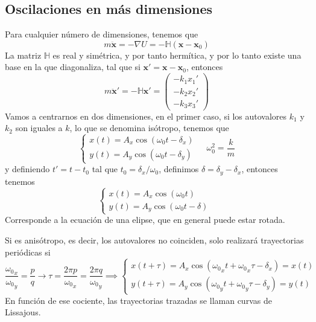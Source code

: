 \subsection{Oscilaciones en más dimensiones}
Para cualquier número de dimensiones, tenemos que
\begin{equation} \label{6.1.1}
    m\ddot{\mathbf{x}} = -\nabla U = -\mathbb{H} (\mathbf{x}-\mathbf{x}_0) 
\end{equation}
La matriz $\mathbb{H}$ es real y simétrica, y por tanto hermítica, y por lo tanto existe una base en la que diagonaliza, tal que si $\mathbf{x}' = \mathbf{x}-\mathbf{x}_0$, entonces
\begin{equation} \label{6.1.1}
    m\ddot{\mathbf{x}}' = -\mathbb{H} \mathbf{x}' = \left(\begin{matrix}
        -k_1 x_1' \\ -k_2 x_2' \\ -k_3 x_3'
    \end{matrix}\right)
\end{equation}
Vamos a centrarnos en dos dimensiones, en el primer caso, si los autovalores $k_1$ y $k_2$ son iguales a $k$, lo que se denomina isótropo, tenemos que
\begin{equation} \label{6.1.1}
    \left\{\begin{matrix}
        x(t) = A_x \cos(\omega_0t - \delta_x) \\
        y(t) = A_y \cos(\omega_0t - \delta_y) 
    \end{matrix}\right. \ \ \ \ \ \omega_0^2 = \frac{k}{m}
\end{equation}
y definiendo $t' = t-t_0$ tal que $t_0 = \delta_x/\omega_0$, definimos $\delta = \delta_y-\delta_x$, entonces tenemos
\begin{equation} \label{6.1.1}
    \left\{\begin{matrix}
        x(t) = A_x \cos(\omega_0t) \phantom{--}\\
        y(t) = A_y \cos(\omega_0t - \delta) 
    \end{matrix}\right.
\end{equation}
Corresponde a la ecuación de una elipse, que en general puede estar rotada.

Si es anisótropo, es decir, los autovalores no coinciden, solo realizará trayectorias periódicas si 
\begin{equation} \label{6.1.1}
    \frac{{\omega_0}_x}{{\omega_0}_y} = \frac{p}{q} \rightarrow \tau = \frac{2\pi p}{{\omega_0}_x} = \frac{2\pi q}{{\omega_0}_y} \implies \left\{\begin{matrix}
        x(t+\tau) = A_x \cos({\omega_0}_x t + {\omega_0}_x \tau -\delta_x) = x(t) \\
        y(t+\tau) = A_y \cos({\omega_0}_y t +{\omega_0}_y \tau- \delta_y) = y(t)
    \end{matrix}\right.
\end{equation}
En función de ese cociente, las trayectorias trazadas se llaman curvas de Lissajous.
\newpage
{}

